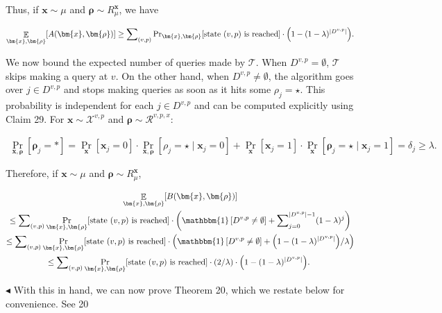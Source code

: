 Thus, if $\bm{x}\sim\mu$ and $\bm{\rho}\sim R_{\mu}^{\bm{x}}$, we have\par


\[\begin{gathered}
\mathop{\mathbb{E}}_{\bm{x},\bm{\rho}}[A(\bm{x},\bm{\rho})]\geq\sum\nolimits_{(v,p)}\Pr\nolimits_{\bm{x},\bm{\rho}}[\text{state $(v,p)$ is reached}]\cdot\Big{(}1-(1-\lambda)^{|D^{v,p}|}\Big{)}.
\end{gathered}\]


We now bound the expected number of queries made by $\mathcal{T}$. When $D^{v,p}=\emptyset$, $\mathcal{T}$ skips making a query at $v$. On the other hand, when $D^{v,p}\neq\emptyset$, the algorithm goes over $j\in D^{v,p}$ and stops making queries as soon as it hits some $\rho_{j}=\star$. This probability is independent for each $j\in D^{v,p}$ and can be computed explicitly using Claim 29. For $\bm{x}\sim\mathcal{X}^{v,p}$ and $\bm{\rho}\sim\mathcal{R}^{v,p,x}$:\par


\[\begin{gathered}
\Pr_{\bm{x},\bm{\rho}}[\bm{\rho}_{j}=*]=\Pr_{\bm{x}}[\bm{x}_{j}=0]\cdot\Pr_{\bm{x},\bm{\rho}}[\rho_{j}=\star\mid\bm{x}_{j}=0]+\Pr_{\bm{x}}[\bm{x}_{j}=1]\cdot\Pr_{\bm{x}}[\bm{\rho}_{j}=\star\mid\bm{x}_{j}=1]=\delta_{j}\geq\lambda.
\end{gathered}\]


Therefore, if $\bm{x}\sim\mu$ and $\bm{\rho}\sim R_{\mu}^{\bm{x}}$,\par


\[\begin{gathered}
\displaystyle\mathop{\mathbb{E}}_{\bm{x},\bm{\rho}}[B(\bm{x},\bm{\rho})] \\
\displaystyle\leq \displaystyle\sum\nolimits_{(v,p)}\Pr_{\bm{x},\bm{\rho}}[\text{state $(v,p)$ is reached}]\cdot\left(\mathbbm{1}\left[D^{v,p}\neq\emptyset\right]+\sum\nolimits_{j=0}^{|D^{v,p}|-1}(1-\lambda)^{j}\right) \\
\displaystyle\leq \displaystyle\sum\nolimits_{(v,p)}\Pr_{\bm{x},\bm{\rho}}[\text{state $(v,p)$ is reached}]\cdot\left(\mathbbm{1}\left[D^{v,p}\neq\emptyset\right]+\Big{(}1-(1-\lambda)^{|D^{v,p}|}\Big{)}/\lambda\right) \\
\displaystyle\leq \displaystyle\sum\nolimits_{(v,p)}\Pr_{\bm{x},\bm{\rho}}[\text{state $(v,p)$ is reached}]\cdot\left(2/\lambda\right)\cdot\Big{(}1-(1-\lambda)^{|D^{v,p}|}\Big{)}.\
\end{gathered}\]


$\blacktriangleleft$
With this in hand, we can now prove Theorem 20, which we restate below for convenience.
See 20\par





